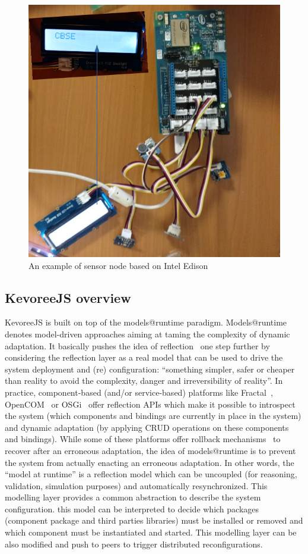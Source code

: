\begin{figure}[h]
	\centering
	\includegraphics[width=0.8\linewidth]{figures/fig4}
	\caption{An example of sensor node based on Intel Edison}
	\label{fig:fig2}
\end{figure}


\subsection{KevoreeJS overview }
KevoreeJS is built on top of the models@runtime paradigm. Models@runtime denotes model-driven approaches aiming at taming the complexity of dynamic adaptation. It basically pushes the idea of reflection~\cite{DBLP:conf/icse/MorinBNJ09} one step further by considering the reflection layer as a real model that can be used to drive the system deployment and (re) configuration: ``something simpler, safer or cheaper than reality to avoid the complexity, danger and irreversibility of reality''. In practice, component-based (and/or service-based) platforms like Fractal~\cite{bruneton2006fractal}, OpenCOM~\cite{grace2005reflective} or OSGi~\cite{hall2011osgi} offer reflection APIs which make it possible to introspect the system (which components and bindings are currently in place in the system) and dynamic adaptation (by applying CRUD operations on these components and bindings). While some of these platforms offer rollback mechanisms~\cite{david2006safe} to recover after an erroneous adaptation, the idea of models@runtime is to prevent the system from actually enacting an erroneous adaptation. In other words, the ``model at runtime'' is a reflection model which can be uncoupled (for reasoning, validation, simulation purposes) and automatically resynchronized. This modelling layer provides a common abstraction to describe the system configuration. this model can be interpreted to decide which packages (component package and third parties libraries) must be installed or removed and which component must be instantiated and started. This modelling layer can be also modified and push to peers to trigger distributed reconfigurations. 

